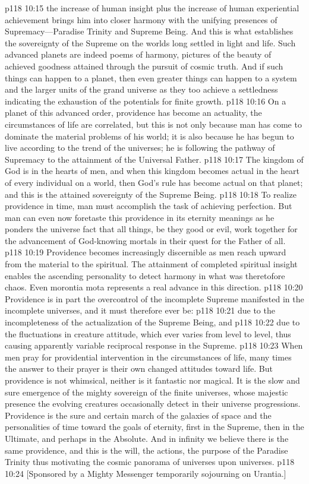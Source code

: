 \pc \vs p118 10:15 \bibnobreakspace {}the increase of human insight plus the increase of human experiential achievement brings him into closer harmony with the unifying presences of Supremacy---Paradise Trinity and Supreme Being. And this is what establishes the sovereignty of the Supreme on the worlds long settled in light and life. Such advanced planets are indeed poems of harmony, pictures of the beauty of achieved goodness attained through the pursuit of cosmic truth. And if such things can happen to a planet, then even greater things can happen to a system and the larger units of the grand universe as they too achieve a settledness indicating the exhaustion of the potentials for finite growth.
\pc \vs p118 10:16 On a planet of this advanced order, providence has become an actuality, the circumstances of life are correlated, but this is not only because man has come to dominate the material problems of his world; it is also because he has begun to live according to the trend of the universes; he is following the pathway of Supremacy to the attainment of the Universal Father.
\pc \vs p118 10:17 The kingdom of God is in the hearts of men, and when this kingdom becomes actual in the heart of every individual on a world, then God’s rule has become actual on that planet; and this is the attained sovereignty of the Supreme Being.
\vs p118 10:18 To realize providence in time, man must accomplish the task of achieving perfection. But man can even now foretaste this providence in its eternity meanings as he ponders the universe fact that all things, be they good or evil, work together for the advancement of God\hyp{}knowing mortals in their quest for the Father of all.
\pc \vs p118 10:19 Providence becomes increasingly discernible as men reach upward from the material to the spiritual. The attainment of completed spiritual insight enables the ascending personality to detect harmony in what was theretofore chaos. Even morontia mota represents a real advance in this direction.
\vs p118 10:20 Providence is in part the overcontrol of the incomplete Supreme manifested in the incomplete universes, and it must therefore ever be:
\pc \vs p118 10:21 \bibnobreakspace {}due to the incompleteness of the actualization of the Supreme Being, and
\vs p118 10:22 \bibnobreakspace {}due to the fluctuations in creature attitude, which ever varies from level to level, thus causing apparently variable reciprocal response in the Supreme.
\pc \vs p118 10:23 When men pray for providential intervention in the circumstances of life, many times the answer to their prayer is their own changed attitudes toward life. But providence is not whimsical, neither is it fantastic nor magical. It is the slow and sure emergence of the mighty sovereign of the finite universes, whose majestic presence the evolving creatures occasionally detect in their universe progressions. Providence is the sure and certain march of the galaxies of space and the personalities of time toward the goals of eternity, first in the Supreme, then in the Ultimate, and perhaps in the Absolute. And in infinity we believe there is the same providence, and this is the will, the actions, the purpose of the Paradise Trinity thus motivating the cosmic panorama of universes upon universes.
\vsetoff
\vs p118 10:24 [Sponsored by a Mighty Messenger temporarily sojourning on Urantia.]
